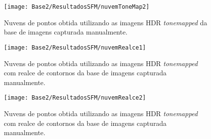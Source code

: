 \begin{figure}[H]
  \centering 
  \texttt{[image: Base2/ResultadosSFM/nuvemToneMap2]}
  \caption{Nuvens de pontos obtida utilizando as imagens HDR \textit{tonemapped} da base de imagens capturada manualmente.}
  \label{figNuvemPontos2B2}
\end{figure}

\begin{figure}[H]
  \centering 
  \texttt{[image: Base2/ResultadosSFM/nuvemRealce1]}
  \caption{Nuvens de pontos obtida utilizando as imagens HDR \textit{tonemapped} com realce de contornos da base de imagens capturada manualmente.}
  \label{figNuvemPontos2C}
\end{figure}

\begin{figure}[H]
  \centering 
  \texttt{[image: Base2/ResultadosSFM/nuvemRealce2]}
  \caption{Nuvens de pontos obtida utilizando as imagens HDR \textit{tonemapped} com realce de contornos da base de imagens capturada manualmente.}
  \label{figNuvemPontos2C2}
\end{figure}